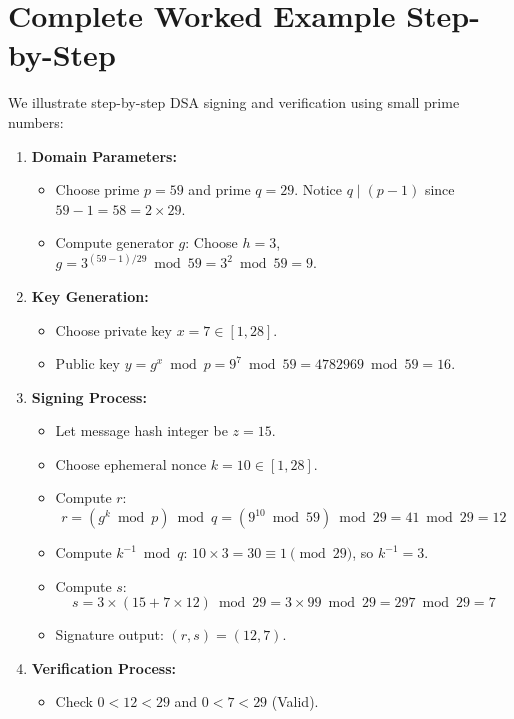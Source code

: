 \section{Complete Worked Example Step-by-Step}
We illustrate step-by-step DSA signing and verification using small prime numbers:
\begin{enumerate}
    \item \textbf{Domain Parameters:}
    \begin{itemize}
        \item Choose prime $p = 59$ and prime $q = 29$. Notice $q \mid (p - 1)$ since $59 - 1 = 58 = 2 \times 29$.
        \item Compute generator $g$: Choose $h = 3$, $g = 3^{(59-1)/29} \bmod 59 = 3^2 \bmod 59 = 9$.
    \end{itemize}
    \item \textbf{Key Generation:}
    \begin{itemize}
        \item Choose private key $x = 7 \in [1, 28]$.
        \item Public key $y = g^x \bmod p = 9^7 \bmod 59 = 4782969 \bmod 59 = 16$.
    \end{itemize}
    \item \textbf{Signing Process:}
    \begin{itemize}
        \item Let message hash integer be $z = 15$.
        \item Choose ephemeral nonce $k = 10 \in [1, 28]$.
        \item Compute $r$:
        \begin{equation}
        r = (g^k \bmod p) \bmod q = (9^{10} \bmod 59) \bmod 29 = 41 \bmod 29 = 12
        \end{equation}
        \item Compute $k^{-1} \bmod q$: $10 \times 3 = 30 \equiv 1 \pmod{29}$, so $k^{-1} = 3$.
        \item Compute $s$:
        \begin{equation}
        s = 3 \times (15 + 7 \times 12) \bmod 29 = 3 \times 99 \bmod 29 = 297 \bmod 29 = 7
        \end{equation}
        \item Signature output: $(r, s) = (12, 7)$.
    \end{itemize}
    \item \textbf{Verification Process:}
    \begin{itemize}
        \item Check $0 < 12 < 29$ and $0 < 7 < 29$ (Valid).

\end{itemize}
\end{enumerate}
